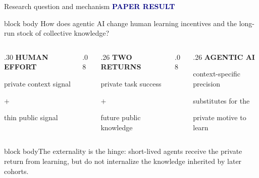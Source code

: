 \documentclass[aspectratio=169,10pt]{beamer}
\newcommand{\paperlabel}{\textcolor{Navy}{\scriptsize\bfseries PAPER RESULT}}
\newcommand{\softbox}[1]{\begin{beamercolorbox}[rounded=true,sep=.6em]{block body}#1\end{beamercolorbox}}
\begin{document}
\begin{frame}{Research question and mechanism}
  \paperlabel
  \vspace{.15cm}

  \begin{beamercolorbox}[rounded=true,sep=.75em]{block body}
    \centering\large How does agentic AI change human learning incentives and
    the long-run stock of collective knowledge?
  \end{beamercolorbox}

  \vspace{.4cm}
  \begin{columns}[T,onlytextwidth]
    \begin{column}{.30\textwidth}
      \centering
      {\color{Navy}\bfseries HUMAN EFFORT}\par
      \vspace{.15cm}
      private context signal\par
      {\color{Teal}$+$}\par
      thin public signal
    \end{column}
    \begin{column}{.08\textwidth}
      \centering\vspace{.45cm}{\color{Gold}\Large$\Longrightarrow$}
    \end{column}
    \begin{column}{.26\textwidth}
      \centering
      {\color{Navy}\bfseries TWO RETURNS}\par
      \vspace{.15cm}
      private task success\par
      {\color{Teal}$+$}\par
      future public knowledge
    \end{column}
    \begin{column}{.08\textwidth}
      \centering\vspace{.45cm}{\color{Gold}\Large$\Longleftarrow$}
    \end{column}
    \begin{column}{.26\textwidth}
      \centering
      {\color{Navy}\bfseries AGENTIC AI}\par
      \vspace{.15cm}
      context-specific precision\par
      substitutes for the\par
      private motive to learn
    \end{column}
  \end{columns}

  \vspace{.5cm}
  \softbox{\small The externality is the hinge: short-lived agents receive the
  private return from learning, but do not internalize the knowledge inherited by
  later cohorts.}
\end{frame}
\end{document}
